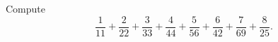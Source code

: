 Compute
\[\dfrac{1}{11}+\dfrac{2}{22}+\dfrac{3}{33}+\dfrac{4}{44}+\dfrac{5}{56}+\dfrac{6}{42}+\dfrac{7}{69}+\dfrac{8}{25}.\]

